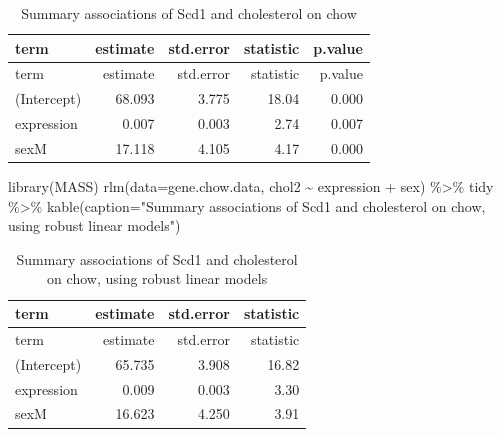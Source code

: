 \documentclass[
]{article}
\newenvironment{Shaded}{\begin{snugshade}}{\end{snugshade}}
\newcommand{\AttributeTok}[1]{\textcolor[rgb]{0.77,0.63,0.00}{#1}}
\newcommand{\FunctionTok}[1]{\textcolor[rgb]{0.00,0.00,0.00}{#1}}
\newcommand{\NormalTok}[1]{#1}
\newcommand{\SpecialCharTok}[1]{\textcolor[rgb]{0.00,0.00,0.00}{#1}}
\newcommand{\StringTok}[1]{\textcolor[rgb]{0.31,0.60,0.02}{#1}}
\begin{document}
\begin{longtable}[]{@{}lrrrr@{}}
\caption{Summary associations of Scd1 and cholesterol on
chow}\tabularnewline
\toprule()
term & estimate & std.error & statistic & p.value \\
\midrule()
\endfirsthead
\toprule()
term & estimate & std.error & statistic & p.value \\
\midrule()
\endhead
(Intercept) & 68.093 & 3.775 & 18.04 & 0.000 \\
expression & 0.007 & 0.003 & 2.74 & 0.007 \\
sexM & 17.118 & 4.105 & 4.17 & 0.000 \\
\bottomrule()
\end{longtable}

\begin{Shaded}
\begin{Highlighting}[]
\FunctionTok{library}\NormalTok{(MASS)}
\FunctionTok{rlm}\NormalTok{(}\AttributeTok{data=}\NormalTok{gene.chow.data, chol2 }\SpecialCharTok{\textasciitilde{}}\NormalTok{ expression }\SpecialCharTok{+}\NormalTok{ sex) }\SpecialCharTok{\%\textgreater{}\%}
\NormalTok{  tidy }\SpecialCharTok{\%\textgreater{}\%}
  \FunctionTok{kable}\NormalTok{(}\AttributeTok{caption=}\StringTok{"Summary associations of Scd1 and cholesterol on chow, using robust linear models"}\NormalTok{)}
\end{Highlighting}
\end{Shaded}

\begin{longtable}[]{@{}lrrr@{}}
\caption{Summary associations of Scd1 and cholesterol on chow, using
robust linear models}\tabularnewline
\toprule()
term & estimate & std.error & statistic \\
\midrule()
\endfirsthead
\toprule()
term & estimate & std.error & statistic \\
\midrule()
\endhead
(Intercept) & 65.735 & 3.908 & 16.82 \\
expression & 0.009 & 0.003 & 3.30 \\
sexM & 16.623 & 4.250 & 3.91 \\
\bottomrule()
\end{longtable}
\end{document}
